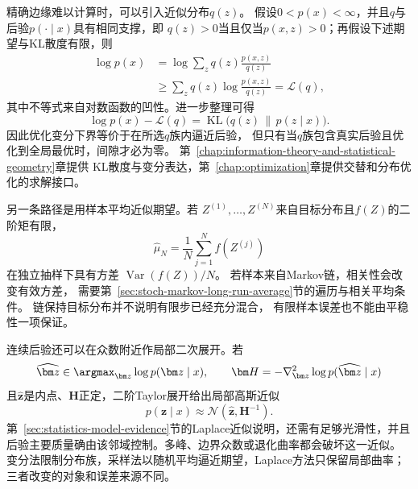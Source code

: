 精确边缘难以计算时，可以引入近似分布$q(z)$。
假设$0<p(x)<\infty$，并且$q$与后验$p(\cdot\mid x)$具有相同支撑，即
$q(z)>0$当且仅当$p(x,z)>0$；再假设下述期望与KL散度有限，则
\begin{align}
  \log p(x)
  &=
  \log
  \sum_z
  q(z)\frac{p(x,z)}{q(z)}
  \nonumber\\
  &\geq
  \sum_z
  q(z)
  \log\frac{p(x,z)}{q(z)}
  =
  \mathcal{L}(q),
  \label{eq:future-elbo}
\end{align}
其中不等式来自对数函数的凹性。进一步整理可得
\[
  \log p(x)-\mathcal{L}(q)
  =
  \operatorname{KL}\bigl(q(z)\,\|\,p(z\mid x)\bigr).
\]
因此优化变分下界等价于在所选$q$族内逼近后验，
但只有当$q$族包含真实后验且优化到全局最优时，间隙才必为零。
第~\ref{chap:information-theory-and-statistical-geometry}章提供
KL散度与变分表达，第~\ref{chap:optimization}章提供交替和分布优化的求解接口。

另一条路径是用样本平均近似期望。若
$Z^{(1)},\ldots,Z^{(N)}$来自目标分布且$f(Z)$的二阶矩有限，
\[
  \widehat\mu_N
  =
  \frac{1}{N}
  \sum_{j=1}^{N}f(Z^{(j)})
\]
在独立抽样下具有方差
$\operatorname{Var}(f(Z))/N$。
若样本来自Markov链，相关性会改变有效方差，
需要第~\ref{sec:stoch-markov-long-run-average}节的遍历与相关平均条件。
链保持目标分布并不说明有限步已经充分混合，
有限样本误差也不能由平稳性一项保证。

连续后验还可以在众数附近作局部二次展开。若
\[
  \widehat{\bm z}
  \in
  \argmax_{\bm z}\log p(\bm z\mid x),
  \qquad
  \bm H
  =
  -\nabla^2_{\bm z}\log p(\widehat{\bm z}\mid x)
\]
且$\widehat{\bm z}$是内点、$\bm H$正定，二阶Taylor展开给出局部高斯近似
\[
  p(\bm z\mid x)
  \approx
  \mathcal N(\widehat{\bm z},\bm H^{-1}).
\]
第~\ref{sec:statistics-model-evidence}节的Laplace近似说明，还需有足够光滑性，并且
后验主要质量确由该邻域控制。多峰、边界众数或退化曲率都会破坏这一近似。
变分法限制分布族，采样法以随机平均逼近期望，Laplace方法只保留局部曲率；
三者改变的对象和误差来源不同。

